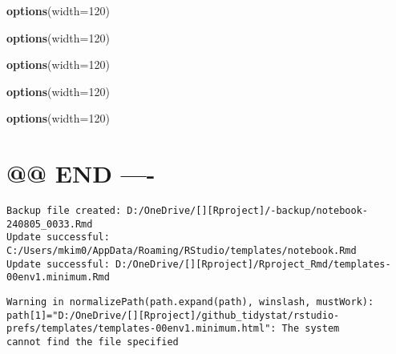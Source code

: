 \documentclass[
]{article}
\newenvironment{Shaded}{\begin{snugshade}}{\end{snugshade}}
\newcommand{\AttributeTok}[1]{\textcolor[rgb]{0.13,0.29,0.53}{#1}}
\newcommand{\DecValTok}[1]{\textcolor[rgb]{0.00,0.00,0.81}{#1}}
\newcommand{\FunctionTok}[1]{\textcolor[rgb]{0.13,0.29,0.53}{\textbf{#1}}}
\newcommand{\NormalTok}[1]{#1}
\begin{document}
\begin{Shaded}
\begin{Highlighting}[]
\FunctionTok{options}\NormalTok{(}\AttributeTok{width=}\DecValTok{120}\NormalTok{)}
\end{Highlighting}
\end{Shaded}

\begin{Shaded}
\begin{Highlighting}[]
\FunctionTok{options}\NormalTok{(}\AttributeTok{width=}\DecValTok{120}\NormalTok{)}
\end{Highlighting}
\end{Shaded}

\begin{Shaded}
\begin{Highlighting}[]
\FunctionTok{options}\NormalTok{(}\AttributeTok{width=}\DecValTok{120}\NormalTok{)}
\end{Highlighting}
\end{Shaded}

\begin{Shaded}
\begin{Highlighting}[]
\FunctionTok{options}\NormalTok{(}\AttributeTok{width=}\DecValTok{120}\NormalTok{)}
\end{Highlighting}
\end{Shaded}

\begin{Shaded}
\begin{Highlighting}[]
\FunctionTok{options}\NormalTok{(}\AttributeTok{width=}\DecValTok{120}\NormalTok{)}
\end{Highlighting}
\end{Shaded}

\hypertarget{end--}{%
\section{@@ END ----}\label{end--}}

\begin{verbatim}
Backup file created: D:/OneDrive/[][Rproject]/-backup/notebook-240805_0033.Rmd
Update successful: C:/Users/mkim0/AppData/Roaming/RStudio/templates/notebook.Rmd
Update successful: D:/OneDrive/[][Rproject]/Rproject_Rmd/templates-00env1.minimum.Rmd
\end{verbatim}

\begin{verbatim}
Warning in normalizePath(path.expand(path), winslash, mustWork):
path[1]="D:/OneDrive/[][Rproject]/github_tidystat/rstudio-prefs/templates/templates-00env1.minimum.html": The system
cannot find the file specified
\end{verbatim}
\end{document}
